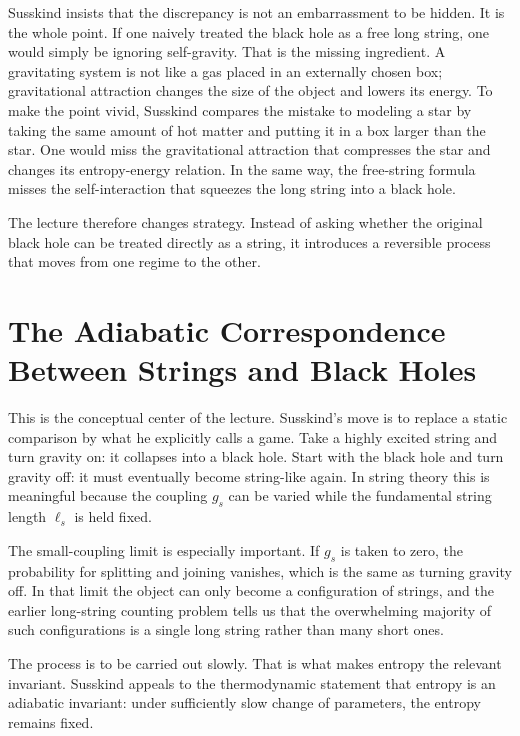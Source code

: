 Susskind insists that the discrepancy is not an embarrassment to be hidden. It is the whole point. If one naively treated the black hole as a free long string, one would simply be ignoring self-gravity. That is the missing ingredient. A gravitating system is not like a gas placed in an externally chosen box; gravitational attraction changes the size of the object and lowers its energy. To make the point vivid, Susskind compares the mistake to modeling a star by taking the same amount of hot matter and putting it in a box larger than the star. One would miss the gravitational attraction that compresses the star and changes its entropy-energy relation. In the same way, the free-string formula misses the self-interaction that squeezes the long string into a black hole.

The lecture therefore changes strategy. Instead of asking whether the original black hole can be treated directly as a string, it introduces a reversible process that moves from one regime to the other.

\section{The Adiabatic Correspondence Between Strings and Black Holes}

This is the conceptual center of the lecture. Susskind's move is to replace a static comparison by what he explicitly calls a game. Take a highly excited string and turn gravity on: it collapses into a black hole. Start with the black hole and turn gravity off: it must eventually become string-like again. In string theory this is meaningful because the coupling \(g_s\) can be varied while the fundamental string length \(\ell_s\) is held fixed.

The small-coupling limit is especially important. If \(g_s\) is taken to zero, the probability for splitting and joining vanishes, which is the same as turning gravity off. In that limit the object can only become a configuration of strings, and the earlier long-string counting problem tells us that the overwhelming majority of such configurations is a single long string rather than many short ones.

The process is to be carried out slowly. That is what makes entropy the relevant invariant. Susskind appeals to the thermodynamic statement that entropy is an adiabatic invariant: under sufficiently slow change of parameters, the entropy remains fixed.

